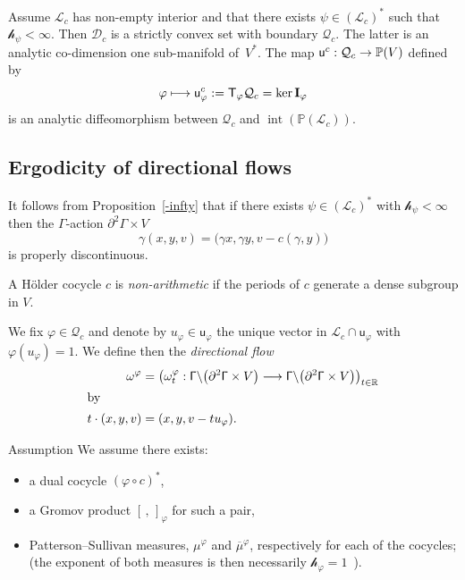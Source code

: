 \documentclass[AHL,Unicode,longabstracts,MathTools]{cedram}
\DeclareMathOperator{\inte}{int}
\newcommand{\scr}{\mathscr}
\newcommand{\hJ}[1]{{\scr h}_{#1}}
\renewcommand{\sf}[1]{{\mathsf{#1}}}
\newcommand{\G}{\sf{\Gamma}}
\newcommand{\cal}{\mathcal}
\newcommand{\calL}{\mathcal{L}}
\newcommand{\calQ}{\mathcal{Q}}
\newcommand{\R}{\mathbb{R}}
\renewcommand{\P}{\mathbb{P}}
\newcommand{\II}{\mathbf{I}}
\newcommand{\g}{\gamma}
\newcommand{\bord}{\partial}
\newcommand{\ps}{\mu}
\newcommand{\df}{\omega}
\newcommand{\ov}{\overline}
\renewcommand{\/}{\backslash}
\newcommand{\<}{\langle}
\renewcommand{\>}{\rangle}
\renewcommand*{\to}{\mathchoice{\longrightarrow}{\rightarrow}{\rightarrow}{\rightarrow}}
\let\oldmapsto\mapsto
\renewcommand*{\mapsto}{\mathchoice{\longmapsto}{\oldmapsto}{\oldmapsto}{\oldmapsto}}
\let\originalleft\left
\let\originalright\right
\renewcommand{\left}{\mathopen{}\mathclose\bgroup\originalleft}
\renewcommand{\right}{\aftergroup\egroup\originalright}
\begin{document}
\begin{coro}
\label{strictly}
Assume $\calL_c$ has non-empty interior and that there exists $\psi\in(\calL_c)^*$ such that $\hJ{\psi}<\infty$. Then $\cal D_c$ is a strictly convex set with boundary $\calQ_c$. The latter is an analytic co-dimension one sub-manifold of~$V^*$. The map $\sf u^c:\calQ_c\to\P(V)$ defined by
\[
\varphi\mapsto\sf u^c_\varphi:=\sf T_\varphi\calQ_c=\ker\II_\varphi
\]
is an analytic diffeomorphism between $\calQ_c$ and $\inte(\P(\calL_c))$.
\end{coro}



\subsection{Ergodicity of directional flows}\label{directional}


It follows from Proposition~\ref{-infty} that if there exists $\psi\in(\calL_c)^*$ with $\hJ\psi<\infty$ then the $\G$-action $\bord^2\G\times V$
\[
\g(x,y,v)=\big(\g x,\g y,v-c(\g,y)\big)
\]
is properly discontinuous.

\begin{defi}
A H\"older cocycle $c$ is \emph{non-arithmetic} if the periods of $c$ generate a dense subgroup in $V$.
\end{defi}

We fix $\varphi\in\calQ_c$ and denote by $u_\varphi\in\sf u_\varphi$ the unique vector in $\cal L_c\cap\sf u_\varphi$ with $\varphi(u_\varphi)=1$. We define then the \emph{directional flow}
\begin{align*}
\df^\varphi &=\left(\df^\varphi_t:\G\/\left(\bord^2\G\times V\right)\to\G\/\left(\bord^2\G\times V\right)\right)_{t\in\R}\\
\intertext{by}
t\cdot(x,y,v) &=(x,y,v-tu_\varphi).
\end{align*}



\begin{enonce}{Assumption}\label{Pat-SulEx}
We assume there exists:
\begin{itemize}
\item a dual cocycle $(\varphi\circ c)^*$,
\item a Gromov product $[\,,\,]_\varphi$ for such a pair,
\item Patterson--Sullivan measures, $\ps^\varphi$ and ${\ov\ps}^\varphi$, respectively for each of the cocycles; (the exponent of both measures is then necessarily $\hJ\varphi=1$~\cite[Proposition~3.3.2]{dichotomy}).
\end{itemize}
\end{enonce}
\end{document}

